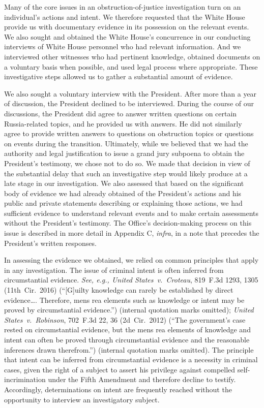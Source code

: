 Many of the core issues in an obstruction-of-justice investigation turn on an individual's actions and intent.
We therefore requested that the White House provide us with documentary evidence in its possession on the relevant events.
We also sought and obtained the White House's concurrence in our conducting interviews of White House personnel who had relevant information.
And we interviewed other witnesses who had pertinent knowledge, obtained documents on a voluntary basis when possible, and used legal process where appropriate.
These investigative steps allowed us to gather a substantial amount of evidence.

We also sought a voluntary interview with the President.
After more than a year of discussion, the President declined to be interviewed.
During the course of our discussions, the President did agree to answer written questions on certain Russia-related topics, and he provided us with answers.
He did not similarly agree to provide written answers to questions on obstruction topics or questions on events during the transition.
Ultimately, while we believed that we had the authority and legal justification to issue a grand jury subpoena to obtain the President's testimony, we chose not to do so.
We made that decision in view of the substantial delay that such an investigative step would likely produce at a late stage in our investigation.
We also assessed that based on the significant body of evidence we had already obtained of the President's actions and his public and private statements describing or explaining those actions, we had sufficient evidence to understand relevant events and to make certain assessments without the President's testimony.
The Office's decision-making process on this issue is described in more detail in Appendix C, \textit{infra}, in a note that precedes the President's written responses.

In assessing the evidence we obtained, we relied on common principles that apply in any investigation.
The issue of criminal intent is often inferred from circumstantial evidence.
\textit{See, e.g., United States~v.\ Croteau}, 819~F.3d 1293, 1305 (11th~Cir.~2016) (``[G]uilty knowledge can rarely be established by direct evidence\dots.
Therefore, mens rea elements such as knowledge or intent may be proved by circumstantial evidence.'') (internal quotation marks omitted);
\textit{United States~v.\ Robinson}, 702~F.3d 22, 36 (2d~Cir.~2012) (``The government's case rested on circumstantial evidence, but the mens rea elements of knowledge and intent can often be proved through circumstantial evidence and the reasonable inferences drawn therefrom.'') (internal quotation marks omitted).
The principle that intent can be inferred from circumstantial evidence is a necessity in criminal cases, given the right of a subject to assert his privilege against compelled self-incrimination under the Fifth Amendment and therefore decline to testify.
Accordingly, determinations on intent are frequently reached without the opportunity to interview an investigatory subject.

